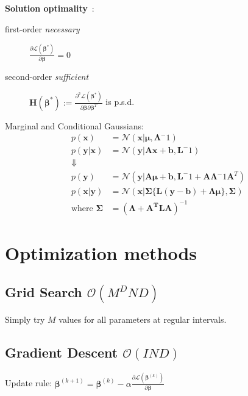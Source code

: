 \documentclass[10pt,a4paper,landscape]{article}
\renewcommand{\bf}[1]{\ensuremath{\mathbf{#1}}}
\newcommand{\bbeta}{\boldsymbol\beta}
\newcommand{\psd}{p.s.d.}
\begin{document}
\begin{multicols*}{4}

\textbf{Solution optimality}~:
\begin{description}
\item[first-order \textit{necessary}] $\frac{\partial\mathcal{L}(\bf{\bbeta}^*)}{\partial\bbeta} = 0$
\item[second-order \textit{sufficient}] $\bf{H}(\bf{\bbeta}^*) := \frac{\partial^2\mathcal{L}(\bbeta^*)}{\partial\bbeta\partial\bbeta^T}$ is \psd
\end{description}



Marginal and Conditional Gaussians:
$$
\begin{aligned}
p(\bf{x}) &= \mathcal{N}(\bf{x} | \boldsymbol\mu, \boldsymbol\Lambda^-1) \\
p(\bf{y}|\bf{x}) &= \mathcal{N}(\bf{y} | \bf{Ax + b, L}^-1) \\
\Downarrow \\
p(\bf{y}) &= \mathcal{N}(\bf{y} | \bf{A} \boldsymbol\mu + \bf{b}, \bf{L}^-1 + \bf{A} \boldsymbol\Lambda^-1 \bf{A}^T)	\\
p(\bf{x}|\bf{y}) &= \mathcal{N}(\bf{x} |\boldsymbol\Sigma \{ \bf{L(y - b) + \Lambda \mu} \}, \boldsymbol\Sigma) \\
\text{where } \boldsymbol\Sigma &= (\boldsymbol\Lambda + \bf{A^T L A})^{-1}
\end{aligned}
$$

\section{Optimization methods}

\subsection{Grid Search \small$\mathcal{O}(M^D N D)$}
Simply try $M$ values for all parameters at regular intervals.

\subsection{Gradient Descent \small$\mathcal{O}(I N D)$}
Update rule: $\bbeta^{(k+1)} = \bbeta^{(k)} - \alpha \frac{\partial \mathcal{L}(\bbeta^{(k)})}{\partial \bbeta}$



\end{multicols*}
\end{document}
